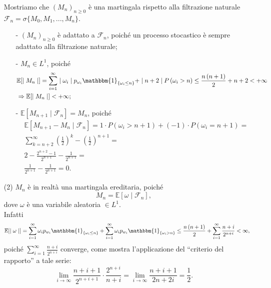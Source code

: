 \documentclass[11pt,largemargins]{homework}
\begin{document}
\begin{enumerate}
Mostriamo che $\left(M_{n}\right)_{n\geq 0}$ è una martingala rispetto alla filtrazione naturale $\mathcal{F}_{n}=\sigma\{M_{0},M_{1},...,M_{n}\}$.
 \begin{itemize}
 \item[-]
 $\left(M_{n}\right)_{n\geq 0}$ è adattato a $\mathcal{F}_{n}$, poiché un processo stocastico è sempre adattato alla filtrazione naturale;
 \item[-]
 $M_{n}\in L^{1}$, poiché
 \begin{align*}
  &\mathbb{E}[\mid M_{n}\mid]=\sum_{i=1}^{\infty}\mid \omega_{i}\mid p_{\omega_{i}}\mathbbm{1}_{\{\omega_{i}\leq n\}} + \mid n+2\mid P\left(\omega_{i}>n\right)\leq \frac{n\left(n+1\right)}{2}+ n+2 < +\infty\\
  &\Rightarrow \mathbb{E}[\mid M_{n}\mid] < +\infty;
   \end{align*}
   \item[-]
   $\mathbb{E}[M_{n+1}\mid \mathcal{F}_{n}]=M_{n}$, poiché
   \begin{align*}
   &\mathbb{E}[M_{n+1}-M_{n}\mid \mathcal{F}_{n}]=1\cdot P\left(\omega_{i}>n+1\right)+\left(-1\right)\cdot P\left(\omega_{i}=n+1\right)=\\
   &\sum_{k=n+2}^{\infty}\left(\frac{1}{2}\right)^{k}-\left(\frac{1}{2}\right)^{n+1}=\\
   &2-\frac{2^{n+2}-1}{2^{n+1}}-\frac{1}{2^{n+1}}=\\
   &\frac{1}{2^{n+1}}-\frac{1}{2^{n+1}}=0.
   \end{align*}
   \end{itemize}   
   \item[(2)]
   $M_{n}$ è in realtà una martingala ereditaria, poiché
   \begin{equation*}
   M_{n}=\mathbb{E}[\omega\mid \mathcal{F}_{n}],
   \end{equation*}
   dove $\omega$ è una variabile aleatoria $\in L^{1}$.\\
   Infatti
   \begin{align*}
   &\mathbb{E}[\mid \omega\mid]=\sum_{i=1}^{\infty}\omega_{i}p_{w_{i}}\mathbbm{1}_{\{\omega_{i}\leq n\}}+\sum_{i=1}^{\infty}\omega_{i}p_{w_{i}}\mathbbm{1}_{\{\omega_{i}>n\}}\leq
   \frac{n\left(n+1\right)}{2}+\sum_{i=1}^{\infty}\frac{n+i}{2^{n+i}}<\infty,
   \end{align*}
   poiché $\sum_{i=1}^{\infty}\frac{n+i}{2^{n+i}}$ converge, come mostra l'applicazione del ``criterio del rapporto'' a tale serie:
   \begin{equation*}
   \lim\limits_{i\rightarrow\infty}\frac{n+i+1}{2^{n+i+1}}\cdot \frac{2^{n+i}}{n+i}=\lim\limits_{i\rightarrow\infty}\frac{n+i+1}{2n+2i}=\frac{1}{2}.

\end{equation*}
\end{enumerate}
\end{document}
